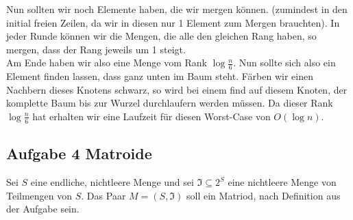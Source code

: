 \documentclass[11pt,a4paper,ngerman]{article}
\begin{document}
\begin{enumerate}[\bfseries (a)]
Nun sollten wir noch Elemente haben, die wir mergen können. (zumindest in den initial freien Zeilen, da wir in diesen nur 1 Element zum Mergen brauchten). In jeder Runde können wir die Mengen, die alle den gleichen Rang haben, so mergen, dass der Rang jeweils um 1 steigt.\\

Am Ende haben wir also eine Menge vom Rank $\log \frac{n}{6}$. Nun sollte sich also ein Element finden lassen, dass ganz unten im Baum steht. Färben wir einen Nachbern dieses Knotens schwarz, so wird bei einem find auf diesem Knoten, der komplette Baum bis zur Wurzel durchlaufern werden müssen. Da dieser Rank $\log \frac{n}{6}$ hat erhalten wir eine Laufzeit für diesen Worst-Case von $O( \log n)$.

\end{enumerate}

\subsection*{Aufgabe 4 \mdseries Matroide}

Sei $S$ eine endliche, nichtleere Menge und sei $\mathfrak{I} \subseteq 2^S$ eine nichtleere Menge von Teilmengen von $S$. Das Paar $M = (S, \mathfrak{I})$ soll ein Matriod, nach Definition aus der Aufgabe sein.
\end{document}
